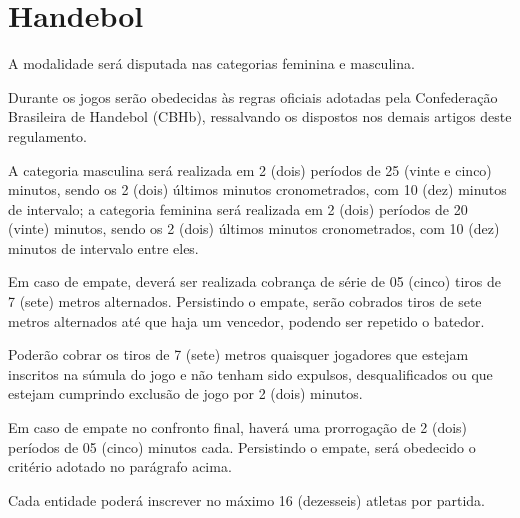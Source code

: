 {\let\clearpage\relax \chapter{Handebol}}

\begin{article}
	A modalidade será disputada nas categorias feminina e masculina.
\end{article}

\begin{article}
	Durante os jogos serão obedecidas às regras oficiais adotadas pela Confederação Brasileira de Handebol (CBHb), ressalvando os dispostos nos demais artigos deste regulamento.
\end{article}

\begin{article}
	A categoria masculina será realizada em 2 (dois) períodos de 25 (vinte e cinco) minutos, sendo os 2 (dois) últimos minutos cronometrados, com 10 (dez) minutos de intervalo; a categoria feminina será realizada em 2 (dois) períodos de 20 (vinte) minutos, sendo os 2 (dois) últimos minutos cronometrados, com 10 (dez) minutos de intervalo entre eles.

	\begin{xparagraph}
		Em caso de empate, deverá ser realizada cobrança de série de 05 (cinco) tiros de 7 (sete) metros alternados. Persistindo o empate, serão cobrados tiros de sete metros alternados até que haja um vencedor, podendo ser repetido o batedor.
	\end{xparagraph}

	\begin{xparagraph}
		Poderão cobrar os tiros de 7 (sete) metros quaisquer jogadores que estejam inscritos na súmula do jogo e não tenham sido expulsos, desqualificados ou que estejam cumprindo exclusão de jogo por 2 (dois) minutos.
	\end{xparagraph}

	\begin{xparagraph}
		Em caso de empate no confronto final, haverá uma prorrogação de 2 (dois) períodos de 05 (cinco) minutos cada. Persistindo o empate, será obedecido o critério adotado no parágrafo acima.
	\end{xparagraph}
\end{article}

\begin{article}
	Cada entidade poderá inscrever no máximo 16 (dezesseis) atletas por partida.
\end{article}

